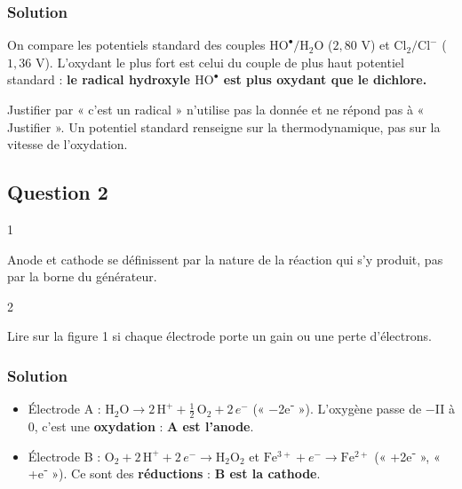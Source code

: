 \documentclass[11pt,a4paper]{article}
\providecommand{\tightlist}{\setlength{\itemsep}{0pt}\setlength{\parskip}{0pt}}
\begin{document}
\hypertarget{solution}{%
\subsubsection{Solution}\label{solution}}

On compare les potentiels standard des couples \(\mathrm{HO^\bullet/H_2O}\) (\(2{,}80\) V) et \(\mathrm{Cl_2/Cl^-}\) (\(1{,}36\) V). L'oxydant le plus fort est celui du couple de plus haut potentiel standard : \textbf{le radical hydroxyle \(\mathrm{HO^\bullet}\) est plus oxydant que le dichlore.}

\begin{piege}

Justifier par « c'est un radical » n'utilise pas la donnée et ne répond pas à « Justifier ». Un potentiel standard renseigne sur la thermodynamique, pas sur la vitesse de l'oxydation.

\end{piege}

\hypertarget{question-2}{%
\subsection{Question 2}\label{question-2}}

\begin{indication}{1}

Anode et cathode se définissent par la nature de la réaction qui s'y produit, pas par la borne du générateur.

\end{indication}

\begin{indication}{2}

Lire sur la figure 1 si chaque électrode porte un gain ou une perte d'électrons.

\end{indication}

\hypertarget{solution-1}{%
\subsubsection{Solution}\label{solution-1}}

\begin{itemize}
\tightlist
\item
  Électrode A : \(\mathrm{H_2O}\to2\,\mathrm{H^+}+\tfrac12\,\mathrm{O_2}+2\,e^-\) (« −2e⁻ »). L'oxygène passe de −II à 0, c'est une \textbf{oxydation} : \textbf{A est l'anode}.
\item
  Électrode B : \(\mathrm{O_2}+2\,\mathrm{H^+}+2\,e^-\to\mathrm{H_2O_2}\) et \(\mathrm{Fe^{3+}}+e^-\to\mathrm{Fe^{2+}}\) (« +2e⁻ », « +e⁻ »). Ce sont des \textbf{réductions} : \textbf{B est la cathode}.
\end{itemize}
\end{document}
